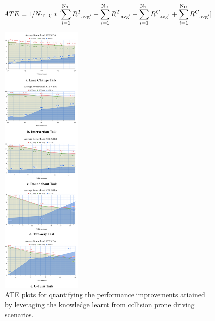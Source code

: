 \documentclass[a4, conference]{IEEEtran}
\begin{document}
    \begin{dmath}
        ATE=1/N\textsubscript{T, C}*[\sum_{i=1}^{\textsubscript{N\textsubscript{T}}}R^T\textsubscript{avg\textsuperscript{i}}+\sum_{i=1}^{\textsubscript{N\textsubscript{C}}}R^T\textsubscript{avg\textsuperscript{i}}-\sum_{i=1}^{\textsubscript{N\textsubscript{T}}}R^C\textsubscript{avg\textsuperscript{i}}+\sum_{i=1}^{\textsubscript{N\textsubscript{C}}} R^C\textsubscript{avg\textsuperscript{i}} ]\
    \end{dmath}

    \begin{figure}
        \centering
        \includegraphics[width=0.35\textwidth]{graph-diagram.png}
        \caption{ATE plots for quantifying the performance improvements attained by leveraging the knowledge learnt from collision prone driving scenarios.}
        \label{fig7}
    \end{figure}
\end{document}
